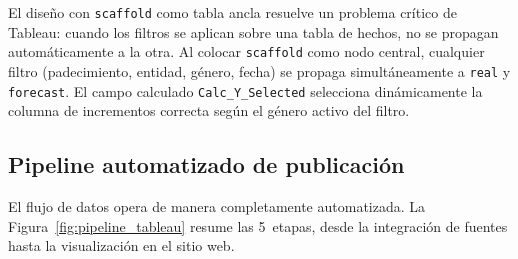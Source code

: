 \documentclass[12pt, letterpaper]{article}
\newcommand{\figref}[1]{Figura~\ref{#1}}
\begin{document}
El diseño con \texttt{scaffold} como tabla ancla resuelve un problema crítico de Tableau: cuando los filtros se aplican sobre una tabla de hechos, no se propagan automáticamente a la otra. Al colocar \texttt{scaffold} como nodo central, cualquier filtro (padecimiento, entidad, género, fecha) se propaga simultáneamente a \texttt{real} y \texttt{forecast}. El campo calculado \texttt{Calc\_Y\_Selected} selecciona dinámicamente la columna de incrementos correcta según el género activo del filtro.

\newpage

\subsection{Pipeline automatizado de publicación}

El flujo de datos opera de manera completamente automatizada. La \figref{fig:pipeline_tableau} resume las 5~etapas, desde la integración de fuentes hasta la visualización en el sitio web.
\end{document}
